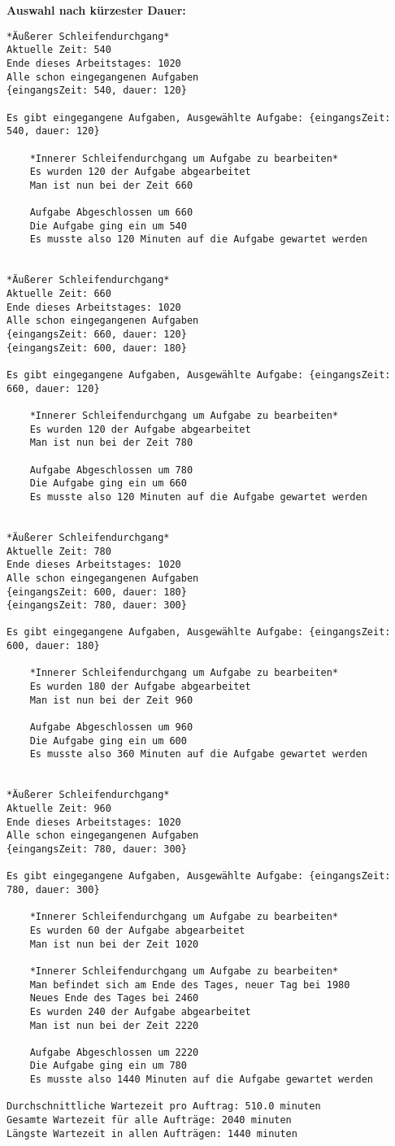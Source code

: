 \documentclass[a4paper,10pt,ngerman]{scrartcl}
\begin{document}
\textbf{ Auswahl nach kürzester Dauer:}
\begin{lstlisting}[numbers=none]
*Äußerer Schleifendurchgang*
Aktuelle Zeit: 540
Ende dieses Arbeitstages: 1020
Alle schon eingegangenen Aufgaben
{eingangsZeit: 540, dauer: 120}

Es gibt eingegangene Aufgaben, Ausgewählte Aufgabe: {eingangsZeit: 540, dauer: 120}

    *Innerer Schleifendurchgang um Aufgabe zu bearbeiten*
    Es wurden 120 der Aufgabe abgearbeitet
    Man ist nun bei der Zeit 660

    Aufgabe Abgeschlossen um 660
    Die Aufgabe ging ein um 540
    Es musste also 120 Minuten auf die Aufgabe gewartet werden


*Äußerer Schleifendurchgang*
Aktuelle Zeit: 660
Ende dieses Arbeitstages: 1020
Alle schon eingegangenen Aufgaben
{eingangsZeit: 660, dauer: 120}
{eingangsZeit: 600, dauer: 180}

Es gibt eingegangene Aufgaben, Ausgewählte Aufgabe: {eingangsZeit: 660, dauer: 120}

    *Innerer Schleifendurchgang um Aufgabe zu bearbeiten*
    Es wurden 120 der Aufgabe abgearbeitet
    Man ist nun bei der Zeit 780

    Aufgabe Abgeschlossen um 780
    Die Aufgabe ging ein um 660
    Es musste also 120 Minuten auf die Aufgabe gewartet werden


*Äußerer Schleifendurchgang*
Aktuelle Zeit: 780
Ende dieses Arbeitstages: 1020
Alle schon eingegangenen Aufgaben
{eingangsZeit: 600, dauer: 180}
{eingangsZeit: 780, dauer: 300}

Es gibt eingegangene Aufgaben, Ausgewählte Aufgabe: {eingangsZeit: 600, dauer: 180}

    *Innerer Schleifendurchgang um Aufgabe zu bearbeiten*
    Es wurden 180 der Aufgabe abgearbeitet
    Man ist nun bei der Zeit 960

    Aufgabe Abgeschlossen um 960
    Die Aufgabe ging ein um 600
    Es musste also 360 Minuten auf die Aufgabe gewartet werden


*Äußerer Schleifendurchgang*
Aktuelle Zeit: 960
Ende dieses Arbeitstages: 1020
Alle schon eingegangenen Aufgaben
{eingangsZeit: 780, dauer: 300}

Es gibt eingegangene Aufgaben, Ausgewählte Aufgabe: {eingangsZeit: 780, dauer: 300}

    *Innerer Schleifendurchgang um Aufgabe zu bearbeiten*
    Es wurden 60 der Aufgabe abgearbeitet
    Man ist nun bei der Zeit 1020

    *Innerer Schleifendurchgang um Aufgabe zu bearbeiten*
    Man befindet sich am Ende des Tages, neuer Tag bei 1980
    Neues Ende des Tages bei 2460
    Es wurden 240 der Aufgabe abgearbeitet
    Man ist nun bei der Zeit 2220

    Aufgabe Abgeschlossen um 2220
    Die Aufgabe ging ein um 780
    Es musste also 1440 Minuten auf die Aufgabe gewartet werden

Durchschnittliche Wartezeit pro Auftrag: 510.0 minuten
Gesamte Wartezeit für alle Aufträge: 2040 minuten
Längste Wartezeit in allen Aufträgen: 1440 minuten
\end{lstlisting}
\end{document}
